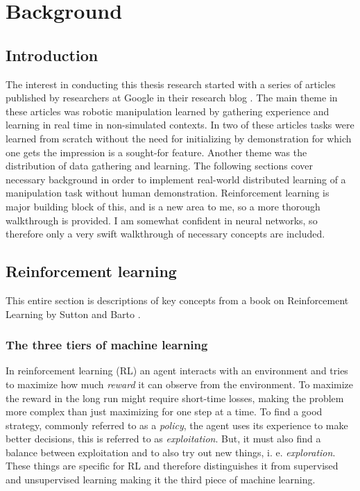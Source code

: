 \section{Background}

\subsection{Introduction}

The interest in conducting this thesis research started with a series of
articles published by researchers at Google in their research blog
\cite{gu2016deep,finn2016deep,yahya2016collective,chebotar2016path}. The main
theme in these articles was robotic manipulation learned by gathering
experience and learning in real time in non-simulated contexts. In two of these
articles \cite{gu2016deep,finn2016deep} tasks were learned from scratch without
the need for initializing by demonstration for which one gets the impression is
a sought-for feature. Another theme was the distribution of data gathering and
learning. The following sections cover necessary background in order to
implement real-world distributed learning of a manipulation task without human
demonstration. Reinforcement learning is major building block of this, and is a
new area to me, so a more thorough walkthrough is provided. I am somewhat
confident in neural networks, so therefore only a very swift walkthrough of
necessary concepts are included.

\subsection{Reinforcement learning}

This entire section is descriptions of key concepts from a book on
Reinforcement Learning by Sutton and Barto \cite{sutton1998reinforcement}.

\subsubsection{The three tiers of machine learning}

In reinforcement learning (RL) an agent interacts with an environment and tries
to maximize how much \textit{reward} it can observe from the environment. To
maximize the reward in the long run might require short-time losses, making the
problem more complex than just maximizing for one step at a time. To find a
good strategy, commonly referred to as a \textit{policy}, the agent uses its
experience to make better decisions, this is referred to as
\textit{exploitation}. But, it must also find a balance between exploitation
and to also try out new things, i. e. \textit{exploration}. These things are
specific for RL and therefore distinguishes it from supervised and unsupervised
learning making it the third piece of machine learning.

